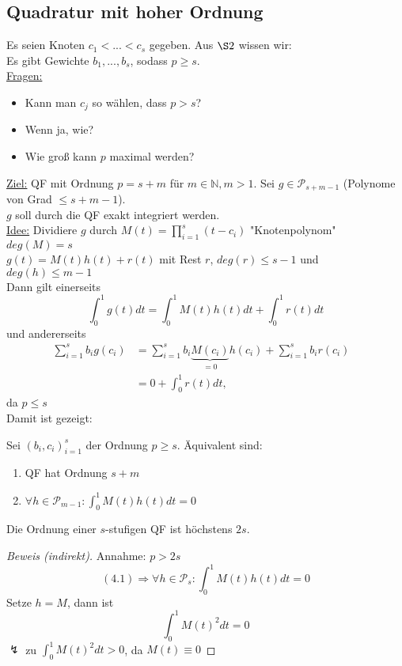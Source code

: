 \subsection{Quadratur mit hoher Ordnung}
Es seien Knoten $c_1< ... < c_s$ gegeben. Aus $\S2$ wissen wir: \\
Es gibt Gewichte $b_1, ..., b_s$, sodass $p \geq s$. \\
\underline{Fragen:} 
\begin{itemize}
  \item Kann man $c_j$ so wählen, dass $p>s$?
  \item Wenn ja, wie?
  \item Wie groß kann $p$ maximal werden?
\end{itemize}
\underline{Ziel:} QF mit Ordnung $p=s+m$ für $m \in \mathbb{N}, m > 1$.
Sei $g \in \mathcal{P}_{s+m-1}$ (Polynome von Grad $\leq s+m-1$).\\
$g$ soll durch die QF exakt integriert werden.\\
\underline{Idee:} Dividiere $g$ durch $M(t) = \prod_{i=1}^s (t-c_i)$ "Knotenpolynom"\\
$deg(M) = s$ \\
$g(t) = M(t) h(t) + r(t)$ mit Rest $r$, $deg(r) \leq s-1$ und $deg(h) \leq m-1$ \\
Dann gilt einerseits
$$\int_0^1 g(t)dt = \int_0^1 M(t)h(t)dt + \int_0^1r(t)dt$$
und andererseits
\begin{align*}\sum_{i=1}^s b_ig(c_i) &= \sum_{i=1}^s b_i \underbrace{M(c_i)}_{= 0} h(c_i) + \sum_{i=1}^s b_ir(c_i) &\\
 &= 0 + \int_0^1 r(t)dt,\end{align*}
 da $p \leq s$\\
Damit ist gezeigt:

\begin{theorem}
Sei $(b_i, c_i)_{i=1}^s$ der Ordnung $p \geq s$. Äquivalent sind:
\begin{enumerate}
  \item QF hat Ordnung $s+m$
  \item $\forall h \in \mathcal{P}_{m-1}:\int_0^1 M(t)h(t)dt = 0$
\end{enumerate}
\end{theorem}

\begin{korollar}
Die Ordnung einer $s$-stufigen QF ist höchstens $2s$.
\begin{proof}[Beweis (indirekt)]
Annahme: $p > 2s$ \\
$$(4.1) \Rightarrow \forall h \in \mathcal{P}_s: \int_0^1 M(t)h(t)dt = 0 $$
Setze $h=M$, dann ist $$ \int_0^1 M(t)^2dt = 0$$
$\lightning$ zu $\int_0^1 M(t)^2 dt > 0$, da $M(t) \equiv 0$
\end{proof}
\end{korollar}

